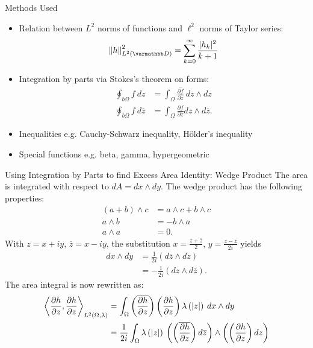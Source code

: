 \documentclass{reu_beamer}
\begin{document}
\begin{frame}{Methods Used}
    \begin{itemize}
        \item Relation between $L^{2}$ norms of functions and $\ell^{2}$ norms of Taylor series:
        \[\norm{h}^2_{L^2(\mathbb{D})} = \sum^\infty_{k = 0} \frac{|h_k|^2}{k+1}\]
        \item Integration by parts via Stokes's theorem on forms:
        \begin{align*}
            \oint_{b\Omega}f\: dz &= \int_{\Omega} \overline{\frac{\partial f}{\partial z}}\:d\overline{z}\wedge dz\\
            \oint_{b\Omega}f\:d\overline{z} &= \int_{\Omega}\frac{\partial f}{\partial z}dz\wedge d\overline{z}.
        \end{align*}
        \item Inequalities e.g. Cauchy-Schwarz inequality, H\"{o}lder's inequality 
        \item Special functions e.g. beta, gamma, hypergeometric 
    \end{itemize}
\end{frame}
\begin{frame}[allowframebreaks]{Using Integration by Parts to find Excess Area Identity: Wedge Product}
  The area is integrated with respect to $dA = dx \wedge dy$. The wedge product has the following properties:
  \begin{align*}
    \left(a+b\right)\wedge c &= a\wedge c + b\wedge c\\
    a\wedge b &= -b\wedge a\\
    a\wedge a &= 0.
  \end{align*}
  With $z = x + iy$, $\overline{z} = x-iy$, the substitution $x = \frac{z + \overline{z}}{2}$, $y = \frac{z - \overline{z}}{2i}$ yields
  \begin{align*}
    dx\wedge dy &= \frac{1}{2i}\left(d\overline{z}\wedge dz\right)\\
                &= -\frac{1}{2i}\left(dz \wedge d\overline{z}\right).
  \end{align*}
  The area integral is now rewritten as:
  \begin{align*}
    \left\langle \frac{\partial h}{\partial z},\frac{\partial h}{\partial z} \right\rangle_{L^{2}\left(\Omega,\lambda\right)} &= \int_{\Omega}^{} \left(\overline{\frac{\partial h}{\partial z}}\right)\left(\frac{\partial h}{\partial z}\right)\lambda\left(|z|\right)\:dx\wedge dy\\
                                                                                                            &= \frac{1}{2i}\int_{\Omega}^{} \lambda\left(|z|\right)\:\left(\left(\overline{\frac{\partial h}{\partial z}}\right)d\overline{z}\right)\wedge \left(\left(\frac{\partial h}{\partial z}\right)dz\right)
  \end{align*}
\end{frame}
\end{document}
